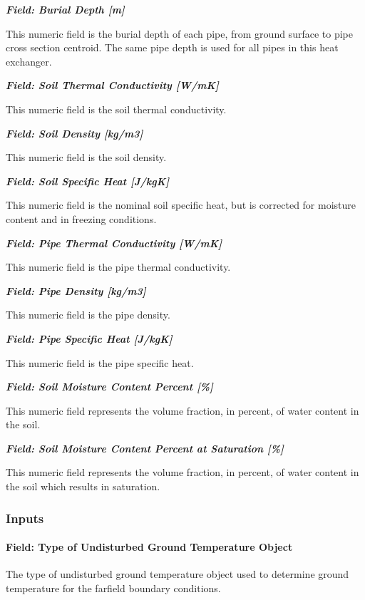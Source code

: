 \textbf{\emph{Field: Burial Depth {[}m{]}}}

This numeric field is the burial depth of each pipe, from ground surface to pipe cross section centroid. The same pipe depth is used for all pipes in this heat exchanger.

\textbf{\emph{Field: Soil Thermal Conductivity {[}W/mK{]}}}

This numeric field is the soil thermal conductivity.

\textbf{\emph{Field: Soil Density {[}kg/m3{]}}}

This numeric field is the soil density.

\textbf{\emph{Field: Soil Specific Heat {[}J/kgK{]}}}

This numeric field is the nominal soil specific heat, but is corrected for moisture content and in freezing conditions.

\textbf{\emph{Field: Pipe Thermal Conductivity {[}W/mK{]}}}

This numeric field is the pipe thermal conductivity.

\textbf{\emph{Field: Pipe Density {[}kg/m3{]}}}

This numeric field is the pipe density.

\textbf{\emph{Field: Pipe Specific Heat {[}J/kgK{]}}}

This numeric field is the pipe specific heat.

\textbf{\emph{Field: Soil Moisture Content Percent {[}\%{]}}}

This numeric field represents the volume fraction, in percent, of water content in the soil.

\textbf{\emph{Field: Soil Moisture Content Percent at Saturation {[}\%{]}}}

This numeric field represents the volume fraction, in percent, of water content in the soil which results in saturation.

\subsubsection{Inputs}\label{inputs-14-002}

\paragraph{Field: Type of Undisturbed Ground Temperature Object}\label{field-type-of-undisturbed-ground-temperature-object-1}

The type of undisturbed ground temperature object used to determine ground temperature for the farfield boundary conditions.

